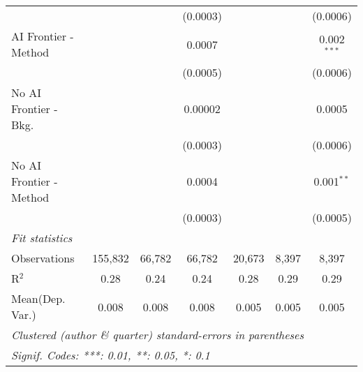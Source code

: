 \begin{tabular}{lcccccc}
                           &                &          & (0.0003)       &                &              & (0.0006)\\   
   AI Frontier - Method    &                &          & 0.0007         &                &              & 0.002$^{***}$\\   
                           &                &          & (0.0005)       &                &              & (0.0006)\\   
   No AI Frontier - Bkg.   &                &          & 0.00002        &                &              & 0.0005\\   
                           &                &          & (0.0003)       &                &              & (0.0006)\\   
   No AI Frontier - Method &                &          & 0.0004         &                &              & 0.001$^{**}$\\   
                           &                &          & (0.0003)       &                &              & (0.0005)\\   
   \midrule
   \emph{Fit statistics}\\
   Observations            & 155,832        & 66,782   & 66,782         & 20,673         & 8,397        & 8,397\\  
   R$^2$                   & 0.28           & 0.24     & 0.24           & 0.28           & 0.29         & 0.29\\  
Mean(Dep. Var.) & 0.008 & 0.008 & 0.008 & 0.005 & 0.005 & 0.005 \\
   \midrule \midrule
   \multicolumn{7}{l}{\emph{Clustered (author \& quarter) standard-errors in parentheses}}\\
   \multicolumn{7}{l}{\emph{Signif. Codes: ***: 0.01, **: 0.05, *: 0.1}}\\
\end{tabular}
\par\endgroup
